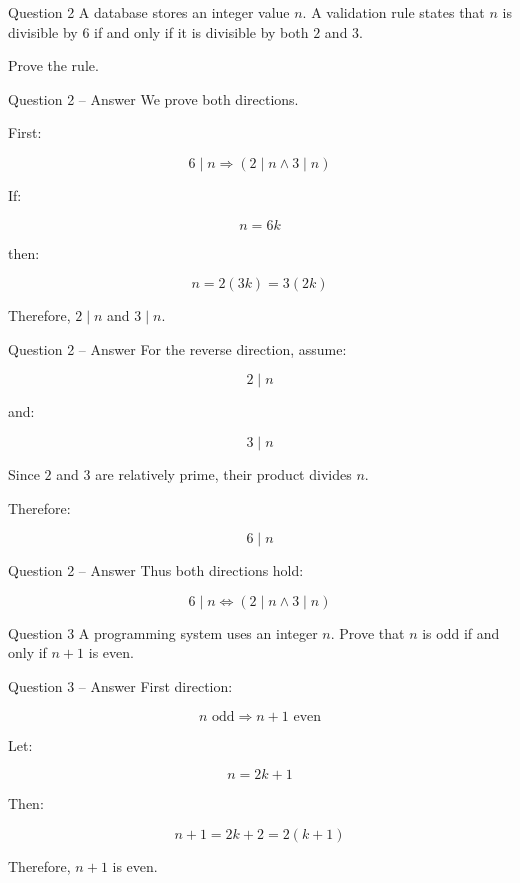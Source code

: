 
\begin{frame}{Question 2}
A database stores an integer value $n$. A validation rule states that $n$
is divisible by $6$ if and only if it is divisible by both $2$ and $3$.

Prove the rule.
\end{frame}

\begin{frame}{Question 2 -- Answer}
We prove both directions.

First:

$$
6\mid n\Rightarrow(2\mid n\land3\mid n)
$$

If:

$$
n=6k
$$

then:

$$
n=2(3k)=3(2k)
$$

Therefore, $2\mid n$ and $3\mid n$.
\end{frame}

\begin{frame}{Question 2 -- Answer}
For the reverse direction, assume:

$$
2\mid n
$$

and:

$$
3\mid n
$$

Since $2$ and $3$ are relatively prime, their product divides $n$.

Therefore:

$$
6\mid n
$$

\end{frame}

\begin{frame}{Question 2 -- Answer}
Thus both directions hold:

$$
\boxed{6\mid n\iff(2\mid n\land3\mid n)}
$$

\end{frame}


\begin{frame}{Question 3}
A programming system uses an integer $n$. Prove that $n$ is odd if and only
if $n+1$ is even.
\end{frame}

\begin{frame}{Question 3 -- Answer}
First direction:

$$
n\text{ odd}\Rightarrow n+1\text{ even}
$$

Let:

$$
n=2k+1
$$

Then:

$$
n+1=2k+2=2(k+1)
$$

Therefore, $n+1$ is even.
\end{frame}

